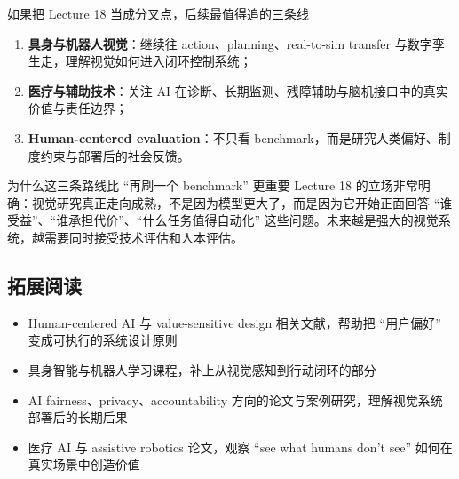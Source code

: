 \documentclass[a4paper]{article}
\begin{document}
\begin{importantbox}{如果把 Lecture 18 当成分叉点，后续最值得追的三条线}
\begin{enumerate}
    \item \textbf{具身与机器人视觉}：继续往 action、planning、real-to-sim transfer 与数字孪生走，理解视觉如何进入闭环控制系统；
    \item \textbf{医疗与辅助技术}：关注 AI 在诊断、长期监测、残障辅助与脑机接口中的真实价值与责任边界；
    \item \textbf{Human-centered evaluation}：不只看 benchmark，而是研究人类偏好、制度约束与部署后的社会反馈。
\end{enumerate}
\end{importantbox}

\begin{knowledgebox}{为什么这三条路线比 ``再刷一个 benchmark'' 更重要}
Lecture 18 的立场非常明确：视觉研究真正走向成熟，不是因为模型更大了，而是因为它开始正面回答 ``谁受益''、``谁承担代价''、``什么任务值得自动化'' 这些问题。未来越是强大的视觉系统，越需要同时接受技术评估和人本评估。
\end{knowledgebox}

\subsection{拓展阅读}

\begin{itemize}
    \item Human-centered AI 与 value-sensitive design 相关文献，帮助把 ``用户偏好'' 变成可执行的系统设计原则
    \item 具身智能与机器人学习课程，补上从视觉感知到行动闭环的部分
    \item AI fairness、privacy、accountability 方向的论文与案例研究，理解视觉系统部署后的长期后果
    \item 医疗 AI 与 assistive robotics 论文，观察 ``see what humans don't see'' 如何在真实场景中创造价值
\end{itemize}
\end{document}
